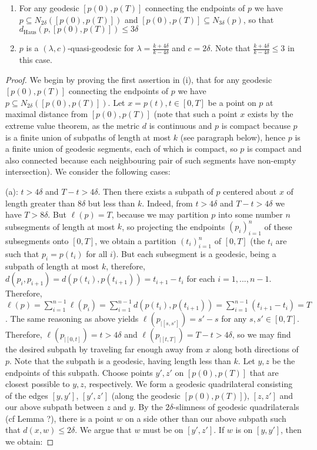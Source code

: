 \documentclass[12pt]{article}
\newcommand{\vs}{\vskip10pt}
\begin{document}
	\begin{enumerate} [label = (\roman*)]
		\item For any geodesic $[p(0), p(T)]$ connecting the endpoints of $p$ we have $p \subseteq N_{2 \delta}([p(0), p(T)])$ and $[p(0), p(T)] \subseteq N_{3 \delta}(p)$, so that $d_{\text{Haus}}(p, [p(0), p(T)]) \leq 3 \delta$ 
		\item 	$p$ is a $(\lambda, c)$-quasi-geodesic for $\lambda = \frac{k + 4 \delta}{k - 4\delta}$ and $c = 2\delta$. Note that $\frac{k + 4 \delta}{k - 4\delta} \leq 3$ in this case. 
	\end{enumerate}
	

	
	\begin{proof}
		
		We begin by proving the first assertion in (i), that for any geodesic $[p(0), p(T)]$ connecting the endpoints of $p$ we have $p \subseteq N_{2 \delta}([p(0), p(T)])$. Let $x = p(t), t \in [0, T]$ be a point on $p$ at maximal distance from $[p(0), p(T)]$ (note that such a point $x$ exists by the extreme value theorem, as the metric $d$ is continuous and $p$ is compact because $p$ is a finite union of subpaths of length at most $k$ (see paragraph below), hence $p$ is a finite union of geodesic segments, each of which is compact, so $p$ is compact and also connected because each neighbouring pair of such segments have non-empty intersection). We consider the following cases: 
		
		\vs 
		
		(a): $t > 4 \delta$ and $T - t > 4 \delta$. Then there exists a subpath of $p$ centered about $x$ of length greater than $8 \delta$ but less than $k$. Indeed, from $t > 4 \delta$ and $T - t > 4 \delta$ we have $T > 8 \delta$. But $\ell(p) = T$, because we may partition $p$ into some number $n$ subsegments of length at most $k$, so projecting the endpoints $(p_i)_{i=1}^n$ of these subsegments onto $[0,T]$, we obtain a partition $(t_i)_{i=1}^n$ of $[0,T]$ (the $t_i$ are such that $p_i = p(t_i)$ for all $i$). But each subsegment is a geodesic, being a subpath of length at most $k$, therefore, $d(p_i, p_{i+1}) = d(p(t_i), p(t_{i+1})) = t_{i+1} - t_i$ for each $i  = 1,...,n-1$. Therefore, $\ell(p) = \sum_{i = 1}^{n-1} \ell(p_i) = \sum_{i = 1}^{n-1} d(p(t_i), p(t_{i+1})) = \sum_{i = 1}^{n-1} (t_{i+1} - t_i) = T$. The same reasoning as above yields $\ell(p_{\vert [s, s']}) = s' - s$ for any $s,s' \in [0,T]$. Therefore, $\ell(p_{\vert [0, t]}) = t > 4 \delta$ and $\ell(p_{\vert [t, T]}) = T - t > 4 \delta$, so we may find the desired subpath by traveling far enough away from $x$ along both directions of $p$. Note that the subpath is a geodesic, having length less than $k$. Let $y, z$ be the endpoints of this subpath. Choose points $y', z'$ on $[p(0), p(T)]$ that are closest possible to $y,z$, respectively. We form a geodesic quadrilateral consisting of the edges $[y, y']$, $[y', z']$ (along the geodesic $[p(0), p(T)]$), $[z,z']$ and our above subpath between $z$ and $y$. By the $2 \delta$-slimness of geodesic quadrilaterals (cf Lemma ?), there is a point $w$ on a side other than our above subpath such that $d(x, w) \leq 2 \delta$. We argue that $w$ must be on $[y', z']$. If $w$ is on $[y, y']$, then we obtain: 
		

\end{proof}
\end{document}
